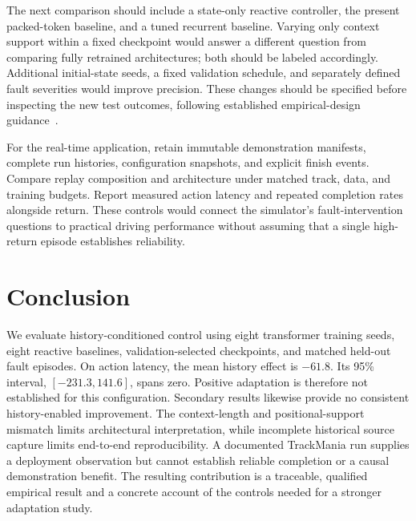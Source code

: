 \documentclass[runningheads]{llncs}
\begin{document}
The next comparison should include a state-only reactive controller, the present packed-token baseline, and a tuned recurrent baseline. Varying only context support within a fixed checkpoint would answer a different question from comparing fully retrained architectures; both should be labeled accordingly. Additional initial-state seeds, a fixed validation schedule, and separately defined fault severities would improve precision. These changes should be specified before inspecting the new test outcomes, following established empirical-design guidance~\cite{empirical}.

For the real-time application, retain immutable demonstration manifests, complete run histories, configuration snapshots, and explicit finish events. Compare replay composition and architecture under matched track, data, and training budgets. Report measured action latency and repeated completion rates alongside return. These controls would connect the simulator's fault-intervention questions to practical driving performance without assuming that a single high-return episode establishes reliability.

\section{Conclusion}
We evaluate history-conditioned control using eight transformer training seeds, eight reactive baselines, validation-selected checkpoints, and matched held-out fault episodes. On action latency, the mean history effect is $-61.8$. Its 95\% interval, $[-231.3,141.6]$, spans zero. Positive adaptation is therefore not established for this configuration. Secondary results likewise provide no consistent history-enabled improvement. The context-length and positional-support mismatch limits architectural interpretation, while incomplete historical source capture limits end-to-end reproducibility. A documented TrackMania run supplies a deployment observation but cannot establish reliable completion or a causal demonstration benefit. The resulting contribution is a traceable, qualified empirical result and a concrete account of the controls needed for a stronger adaptation study.

\end{document}
